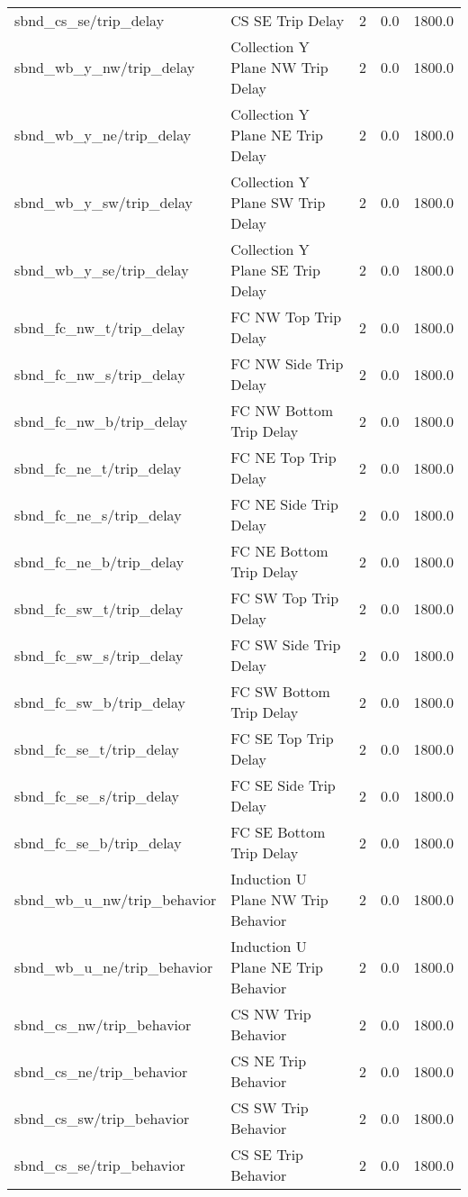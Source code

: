 \begin{center}
\begin{longtable}{l | l l l l }
sbnd\_cs\_se/trip\_delay & CS SE Trip Delay & 2 & 0.0 & 1800.0\\ 
sbnd\_wb\_y\_nw/trip\_delay & Collection Y Plane NW Trip Delay & 2 & 0.0 & 1800.0\\ 
sbnd\_wb\_y\_ne/trip\_delay & Collection Y Plane NE Trip Delay & 2 & 0.0 & 1800.0\\ 
sbnd\_wb\_y\_sw/trip\_delay & Collection Y Plane SW Trip Delay & 2 & 0.0 & 1800.0\\ 
sbnd\_wb\_y\_se/trip\_delay & Collection Y Plane SE Trip Delay & 2 & 0.0 & 1800.0\\ 
sbnd\_fc\_nw\_t/trip\_delay & FC NW Top Trip Delay & 2 & 0.0 & 1800.0\\ 
sbnd\_fc\_nw\_s/trip\_delay & FC NW Side Trip Delay & 2 & 0.0 & 1800.0\\ 
sbnd\_fc\_nw\_b/trip\_delay & FC NW Bottom Trip Delay & 2 & 0.0 & 1800.0\\ 
sbnd\_fc\_ne\_t/trip\_delay & FC NE Top Trip Delay & 2 & 0.0 & 1800.0\\ 
sbnd\_fc\_ne\_s/trip\_delay & FC NE Side Trip Delay & 2 & 0.0 & 1800.0\\ 
sbnd\_fc\_ne\_b/trip\_delay & FC NE Bottom Trip Delay & 2 & 0.0 & 1800.0\\ 
sbnd\_fc\_sw\_t/trip\_delay & FC SW Top Trip Delay & 2 & 0.0 & 1800.0\\ 
sbnd\_fc\_sw\_s/trip\_delay & FC SW Side Trip Delay & 2 & 0.0 & 1800.0\\ 
sbnd\_fc\_sw\_b/trip\_delay & FC SW Bottom Trip Delay & 2 & 0.0 & 1800.0\\ 
sbnd\_fc\_se\_t/trip\_delay & FC SE Top Trip Delay & 2 & 0.0 & 1800.0\\ 
sbnd\_fc\_se\_s/trip\_delay & FC SE Side Trip Delay & 2 & 0.0 & 1800.0\\ 
sbnd\_fc\_se\_b/trip\_delay & FC SE Bottom Trip Delay & 2 & 0.0 & 1800.0\\ 
sbnd\_wb\_u\_nw/trip\_behavior & Induction U Plane NW Trip Behavior & 2 & 0.0 & 1800.0\\ 
sbnd\_wb\_u\_ne/trip\_behavior & Induction U Plane NE Trip Behavior & 2 & 0.0 & 1800.0\\ 
sbnd\_cs\_nw/trip\_behavior & CS NW Trip Behavior & 2 & 0.0 & 1800.0\\ 
sbnd\_cs\_ne/trip\_behavior & CS NE Trip Behavior & 2 & 0.0 & 1800.0\\ 
sbnd\_cs\_sw/trip\_behavior & CS SW Trip Behavior & 2 & 0.0 & 1800.0\\ 
sbnd\_cs\_se/trip\_behavior & CS SE Trip Behavior & 2 & 0.0 & 1800.0\\ 

\end{longtable}
\end{center}
